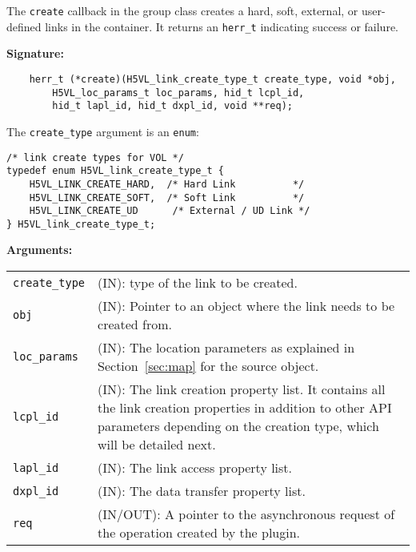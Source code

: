 The \texttt{create} callback in the group class creates a hard,
soft, external, or user-defined links in the container. It returns an
\texttt{herr\_t} indicating success or failure.\bigskip

\begin{mdframed}[style=bgbox]
\textbf{Signature:}
\begin{lstlisting}
    herr_t (*create)(H5VL_link_create_type_t create_type, void *obj,
        H5VL_loc_params_t loc_params, hid_t lcpl_id, 
        hid_t lapl_id, hid_t dxpl_id, void **req);
\end{lstlisting}

The \texttt{create\_type} argument is an \texttt{enum}:
\begin{lstlisting}
/* link create types for VOL */
typedef enum H5VL_link_create_type_t {
    H5VL_LINK_CREATE_HARD,  /* Hard Link          */
    H5VL_LINK_CREATE_SOFT,  /* Soft Link          */
    H5VL_LINK_CREATE_UD      /* External / UD Link */
} H5VL_link_create_type_t;
\end{lstlisting}

\textbf{Arguments:}\\
\begin{tabular}{l p{13.5cm}}
  \texttt{create\_type} & (IN): type of the link to be created.\\
  \texttt{obj} & (IN): Pointer to an object where the link needs to be
  created from.\\
  \texttt{loc\_params} & (IN): The location parameters as explained in
  Section~\ref{sec:map} for the source object. \\
  \texttt{lcpl\_id} & (IN): The link creation property list. It contains
  all the link creation properties in addition to other API parameters
  depending on the creation type, which will be detailed next.\\
  \texttt{lapl\_id} & (IN): The link access property list.\\
  \texttt{dxpl\_id} & (IN): The data transfer property list.\\
  \texttt{req} & (IN/OUT): A pointer to the asynchronous request of the
  operation created by the plugin.\\
\end{tabular}
\end{mdframed}

